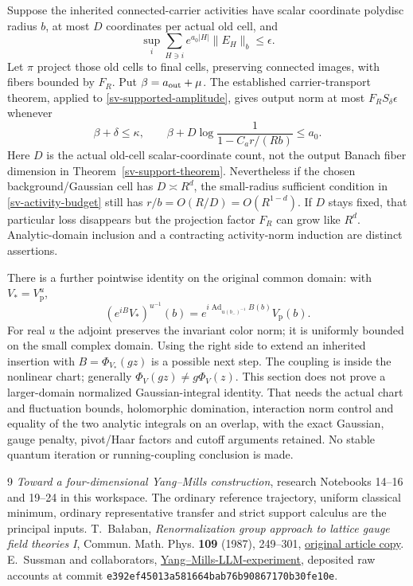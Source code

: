 \documentclass[11pt]{article}
\theoremstyle{remark}
\begin{document}
Suppose the inherited connected-carrier activities have scalar
coordinate polydisc radius $b$, at most $D$ coordinates per actual old
cell, and
\begin{equation}
 \sup_i\sum_{H\ni i}e^{a_0|H|}\|E_H\|_b\le\epsilon.
 \label{sv-old-activity-norm}
\end{equation}
Let $\pi$ project those old cells to final cells, preserving connected
images, with fibers bounded by $F_R$. Put $\beta=a_{\rm out}+\mu$.
The established carrier-transport theorem, applied to
\eqref{sv-supported-amplitude}, gives output norm at most
$F_RS_\delta\epsilon$ whenever
\begin{equation}
 \beta+\delta\le\kappa,\qquad
 \beta+D\log\frac1{1-C_ar/(Rb)}\le a_0.
 \label{sv-activity-budget}
\end{equation}
Here $D$ is the actual old-cell scalar-coordinate count, not the output
Banach fiber dimension in Theorem~\ref{sv-support-theorem}.
Nevertheless if the chosen background/Gaussian cell has
$D\asymp R^d$, the small-radius sufficient condition in
\eqref{sv-activity-budget} still has $r/b=O(R/D)=O(R^{1-d})$.
If $D$ stays fixed, that particular loss disappears but the projection
factor $F_R$ can grow like $R^d$. Analytic-domain inclusion and a
contracting activity-norm induction are distinct assertions.

There is a further pointwise identity on the original common domain:
with $V_*=V_{\mathrm p}^u$,
\begin{equation}
 (e^{iB}V_*)^{u^{-1}}(b)
   =e^{i\operatorname{Ad}_{u(b_-)^{-1}}B(b)}V_{\mathrm p}(b).
 \label{sv-fluctuation-gauge}
\end{equation}
For real $u$ the adjoint preserves the invariant color norm; it is
uniformly bounded on the small complex domain. Using the right side
to extend an inherited insertion with $B=\Phi_{V_*}(gz)$ is a possible
next step. The coupling is inside the nonlinear chart; generally
$\Phi_V(gz)\ne g\Phi_V(z)$. This section does not prove a larger-domain normalized
Gaussian-integral identity. That needs the actual chart and
fluctuation bounds, holomorphic domination, interaction norm control
and equality of the two analytic integrals on an overlap, with the
exact Gaussian, gauge penalty, pivot/Haar factors and cutoff arguments
retained. No stable quantum iteration or running-coupling conclusion
is made.


\begin{thebibliography}{9}
\emph{Toward a four-dimensional Yang--Mills construction},
research Notebooks 14--16 and 19--24 in this workspace.
The ordinary reference trajectory, uniform classical minimum,
ordinary representative transfer and strict support calculus
are the principal inputs.
T.~Ba\l aban,
\emph{Renormalization group approach to lattice gauge field
theories I}, Commun. Math. Phys. \textbf{109} (1987), 249--301,
\href{https://scispace.com/pdf/renormalization-group-approach-to-lattice-gauge-field-3ygai0vxt1.pdf}{original article copy}.
E.~Sussman and collaborators,
\href{https://github.com/ethanwsussman/Yang--Mills-LLM-experiment}{Yang--Mills-LLM-experiment},
deposited raw accounts at commit
\texttt{e392ef45013a581664bab76b90867170b30fe10e}.
\end{thebibliography}
\end{document}
